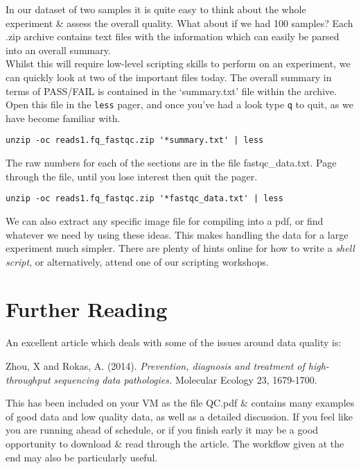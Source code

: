\begin{advanced}
In our dataset of two samples it is quite easy to think about the whole experiment \& assess the overall quality.
What about if we had 100 samples? 
Each .zip archive contains text files with the information which can easily be parsed into an overall summary. \\

Whilst this will require low-level scripting skills to perform on an experiment, we can quickly look at two of the important files today.
The overall summary in terms of PASS/FAIL is contained in the `summary.txt' file within the archive.
Open this file in the \texttt{less} pager, and once you've had a look type \texttt{q} to quit, as we have become familiar with.
\begin{lstlisting}
unzip -oc reads1.fq_fastqc.zip '*summary.txt' | less
\end{lstlisting}

The raw numbers for each of the sections are in the file fastqc_data.txt.
Page through the file, until you lose interest then quit the pager.
\begin{lstlisting}
unzip -oc reads1.fq_fastqc.zip '*fastqc_data.txt' | less
\end{lstlisting}

We can also extract any specific image file for compiling into a pdf, or find whatever we need by using these ideas.
This makes handling the data for a large experiment much simpler.
There are plenty of hints online for how to write a \textit{shell script}, or alternatively, attend one of our scripting workshops.
\end{advanced}

\section{Further Reading}
An excellent article which deals with some of the issues around data quality is:

Zhou, X and Rokas, A. (2014). \textit{Prevention, diagnosis and treatment of high-throughput sequencing data pathologies.} Molecular Ecology 23, 1679-1700.

This has been included on your VM as the file QC.pdf \& contains many examples of good data and low quality data, as well as a detailed discussion.
If you feel like you are running ahead of schedule, or if you finish early it may be a good opportunity to download \& read through the article.
The workflow given at the end may also be particularly useful.